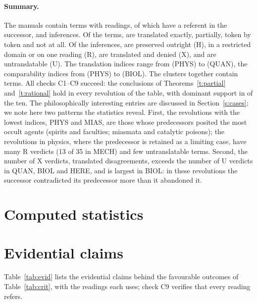 \documentclass{situationist-preprint}
\begin{document}
\paragraph{Summary.} The manuals contain \ntermsall{} terms with \ntokensall{} readings, of which \nrefall{} have a referent in the successor, and \ninfall{} inferences. Of the terms, \nstatE{} are translated exactly, \nstatP{} partially, \nstatT{} token by token and \nstatN{} not at all. Of the inferences, \nverdH{} are preserved outright (H), \nverdR{} in a restricted domain or on one reading (R), \nverdX{} are translated and denied (X), and \nverdU{} are untranslatable (U). The translation indices range from \timin{} (PHYS) to \timax{} (QUAN), the comparability indices from \kappamin{} (PHYS) to \kappamax{} (BIOL). The clusters together contain \nclusterall{} terms. All checks C1--C9 succeed: the conclusions of Theorems~\ref{t:partial} and~\ref{t:rational} hold in every revolution of the table, with dominant support in \ndominant{} of the ten. The philosophically interesting entries are discussed in Section~\ref{s:cases}; we note here two patterns the statistics reveal. First, the revolutions with the lowest indices, PHYS and MIAS, are those whose predecessors posited the most occult agents (spirits and faculties; miasmata and catalytic poisons); the revolutions in physics, where the predecessor is retained as a limiting case, have many R verdicts (13 of 35 in MECH) and few untranslatable terms. Second, the number of X verdicts, translated disagreements, exceeds the number of U verdicts in QUAN, BIOL and HERE, and is largest in BIOL: in these revolutions the successor contradicted its predecessor more than it abandoned it.

\section{Computed statistics}\label{s:stats}


\clearpage

\section{Evidential claims}\label{s:criteria}

Table~\ref{tab:evid} lists the evidential claims behind the favourable outcomes of Table~\ref{tab:crit}, with the readings each uses; check C9 verifies that every reading refers.


\end{document}
